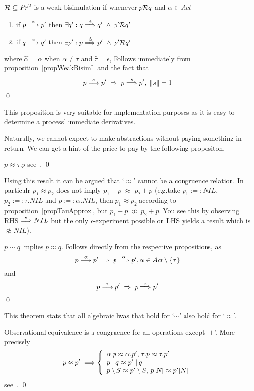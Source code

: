 \begin{proposition}\label{propWeakBisim}
${\cal R}\subseteq Pr^2$ is a weak bisimulation if whenever $p{\cal R}q$ and $\alpha\in Act$
\begin{enumerate}
\item if $p\stackrel{\alpha}{\longrightarrow}p'$ then $\exists q':q\stackrel{\hat{\alpha}}{\Longrightarrow}q'\;\wedge\; p'{\cal R}q'$
\item if $q\stackrel{\alpha}{\longrightarrow}q'$ then $\exists p':p\stackrel{\hat{\alpha}}{\Longrightarrow}p'\;\wedge\; p'{\cal R}q'$
\end{enumerate}
where $\hat{\alpha} = \alpha$ when $\alpha\not=\tau$ and $\hat{\tau} = \epsilon$,
\proof Follows immediately from proposition~\ref{propWeakBisimI} and the fact that
\[
p\stackrel{s}{\longrightarrow}p'\;\Rightarrow\;p\stackrel{\hat{s}}{\Longrightarrow}p',\; \|s\|=1
\]
\qed
\end{proposition}

\noindent
This proposition is very suitable for implementation purposes as it is easy to determine a process' immediate derivatives.

\noindent
Naturally, we cannot expect to make abstractions without paying something in return. We can get a hint of the price to pay by the following propositon.

\begin{proposition}\label{propTauApprox}
$p\approx\tau.p$
\proof see~\cite{Milner}.
\qed
\end{proposition}

\noindent
Using this result it can be argued that `$\approx$' cannot be a congruence relation. In particulr $p_1\approx p_2$ does not imply $p_1+p\;\approx\;p_2+p$ (e.g.\@ take $p_1 :=: NIL$, $p_2 :=:  \tau.NIL$ and $p:=: \alpha.NIL$, then $p_1\approx p_2$ according to proposition~\ref{propTauApprox}, but $p_1+p\;\not\approx\; p_2+p$. You see this by observing RHS $\stackrel{\epsilon}{\Longrightarrow} NIL$ but the only $\epsilon$-experiment possible on LHS yields a result which is $\not\approx NIL$).

\begin{theorem}\label{theoSimImplyApprox}
$p\sim q$ implies $p\approx q$.
\proof Follows directly from the respective propositions, as
\[
p\stackrel{\alpha}{\longrightarrow}p'\;\Rightarrow\;p\stackrel{\alpha}{\Longrightarrow}p', \alpha\in Act\setminus \{\tau\}
\]
and
\[
p\stackrel{\tau}{\longrightarrow}p'\;\Rightarrow\;p\stackrel{\epsilon}{\Longrightarrow}p'
\]
\qed
\end{theorem}

\noindent
This theorem stats that all algebraic lwas that hold for `$\sim$' also hold for `$\approx$'.

\begin{theorem}\label{theoObderCongruence}
Observational equivalence is a congruence for all operations except `$+$'. More precisely
\[
p\approx p'\;\Longrightarrow \left\{
\begin{array}{l}
\alpha.p\approx\alpha.p'\hbox{, }\tau.p\approx\tau.p'\\
p\mid q\approx p'\mid q\\
p\setminus S\approx p'\setminus S\hbox{, }p[N]\approx p'[N]
\end{array}
\right.
\]
\proof see~\cite{Milner}.
\qed
\end{theorem}

